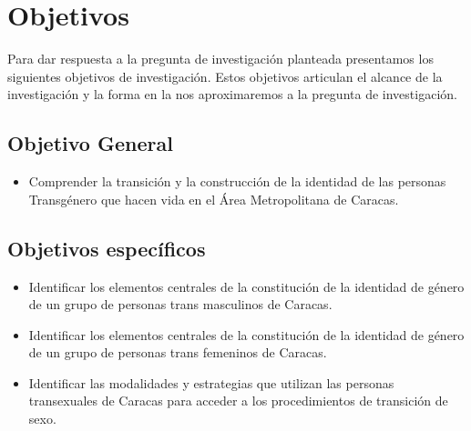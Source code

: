

\section{Objetivos}
Para dar respuesta a la pregunta de investigación planteada presentamos los
siguientes objetivos de investigación.
Estos objetivos articulan el alcance de la investigación y la forma en la nos
aproximaremos a la pregunta de investigación.

\subsection{Objetivo General}
	\begin{itemize}
		\item Comprender la transición y la construcción de la identidad de las
		personas Transgénero que hacen vida en el Área Metropolitana de Caracas.
	\end{itemize}

\subsection{Objetivos específicos}
	\begin{itemize}
		\item Identificar los elementos centrales de la constitución de la identidad
	de género de un grupo de personas trans masculinos de Caracas.
		\item Identificar los elementos centrales de la constitución de la identidad
	de género de un grupo de personas trans femeninos de Caracas.
		\item Identificar las modalidades y estrategias que utilizan las personas
	transexuales de Caracas para acceder a los procedimientos de transición de sexo.
	\end{itemize}
